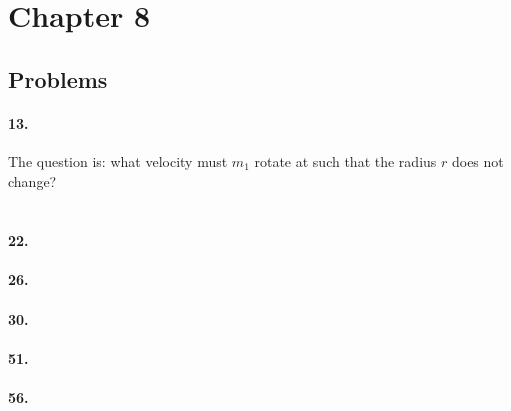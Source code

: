     \section*{Chapter 8}

    \subsection*{Problems}

    \paragraph*{13.}\mbox{}

    The question is: what velocity must $m_{1}$ rotate at such that the radius $r$ does not change?

    \begin{align*}
        
    \end{align*}

    \paragraph*{22.}\mbox{}

    \paragraph*{26.}\mbox{}

    \paragraph*{30.}\mbox{}

    \paragraph*{51.}\mbox{}

    \paragraph*{56.}\mbox{}
    
